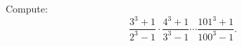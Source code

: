 Compute: \[\dfrac{3^{3}+1}{2^{3}-1}\cdot\dfrac{4^{3}+1}{3^{3}-1}\cdots\dfrac{101^{3}+1}{100^{3}-1}.\]

